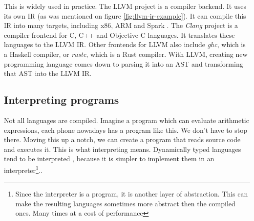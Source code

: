 This is widely used in practice. The LLVM \cite{llvm} project is a compiler backend. It uses its own IR (as was mentioned on figure \ref{fig:llvm-ir-example}).
It can compile this IR into many targets, including x86, ARM and Spark . The \textit{Clang} project is a compiler frontend for C, C++ and Objective-C languages.
It translates these languages to the LLVM IR. Other frontends for LLVM also include \textit{ghc}, which is a Haskell compiler, or \textit{rustc}, which is a Rust compiler.
With LLVM, creating new programming language comes down to parsing it into an AST and transforming that AST into the LLVM IR.

\subsection{Interpreting programs}
Not all languages are compiled. Imagine a program which can evaluate arithmetic expressions, each phone nowadays has a program like this.
We don't have to stop there. Moving this up a notch, we can create a program that reads source code and executes it.
This is what interpreting means. Dynamically typed languages tend to be interpreted \cite{python, lua, javascript}, because it is simpler
to implement them in an interpreter\footnote{Since the interpreter is a program, it is another layer of abstraction. This can make
the resulting languages sometimes more abstract then the compiled ones. Many times at a cost of performance}..


